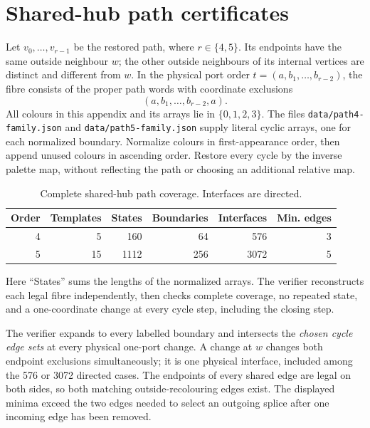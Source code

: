 \clearpage
\section{Shared-hub path certificates}
\label{app:shared-hub-path-certificates}
Let $v_0,\ldots,v_{r-1}$ be the restored path, where $r\in\{4,5\}$.
Its endpoints have the same outside neighbour $w$; the other outside
neighbours of its internal vertices are distinct and different from $w$.
In the physical port order $t=(a,b_1,\ldots,b_{r-2})$, the fibre consists
of the proper path words with coordinate exclusions
\[
 (a,b_1,\ldots,b_{r-2},a).
\]
All colours in this appendix and its arrays lie in $\{0,1,2,3\}$.
The files \texttt{data/path4-family.json} and
\texttt{data/path5-family.json} supply literal cyclic arrays, one for
each normalized boundary. Normalize colours in first-appearance order,
then append unused colours in ascending order. Restore every cycle by
the inverse palette map, without reflecting the path or choosing
an additional relative map.

\begin{table}[htbp]
\centering
\caption{Complete shared-hub path coverage. Interfaces are directed.}
\label{tab:shared-hub-path-counts}
\begin{tabular}{rrrrrr}
\toprule
Order & Templates & States & Boundaries & Interfaces & Min. edges\\
\midrule
4&5&160&64&576&3\\
5&15&1112&256&3072&5\\
\bottomrule
\end{tabular}
\end{table}

Here ``States'' sums the lengths of the normalized arrays. The verifier
reconstructs each legal fibre independently, then checks complete
coverage, no repeated state, and a one-coordinate change at every cycle
step, including the closing step.

The verifier expands to every labelled boundary and intersects the
\emph{chosen cycle edge sets} at every physical one-port change.
A change at $w$ changes both endpoint exclusions simultaneously; it is
one physical interface, included among the 576 or 3072 directed cases.
The endpoints of every shared edge are legal on both sides, so both
matching outside-recolouring edges exist. The displayed minima exceed
the two edges needed to select an outgoing splice after one incoming
edge has been removed.

